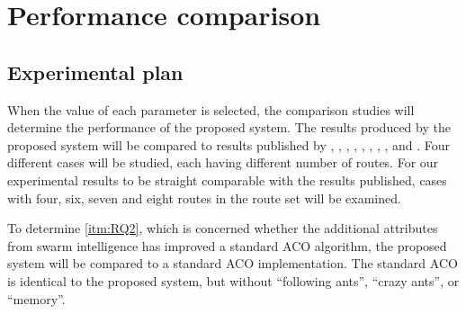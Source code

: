 \section{Performance comparison}
\label{sec:performanceComparison}
\subsection{Experimental plan}
When the value of each parameter is selected, the comparison studies will determine the performance of the proposed system. The results produced by the proposed system will be compared to results published by \citet{mandl79}, \citet{kechagiopoulos14}, \citet{nikolic14}, \citet{kidwai98}, \citet{fan10}, \citet{chakroborty02}, \citet{zhang10}, \citet{chew12}, and \citet{baaj91}. Four different cases will be studied, each having different number of routes. For our experimental results to be straight comparable with the results published, cases with four, six, seven and eight routes in the route set will be examined.

To determine \vref{itm:RQ2}, which is concerned whether the additional attributes from swarm intelligence has improved a standard ACO algorithm, the proposed system will be compared to a standard ACO implementation. The standard ACO is identical to the proposed system, but without ``following ants'', ``crazy ants'', or ``memory''. 

